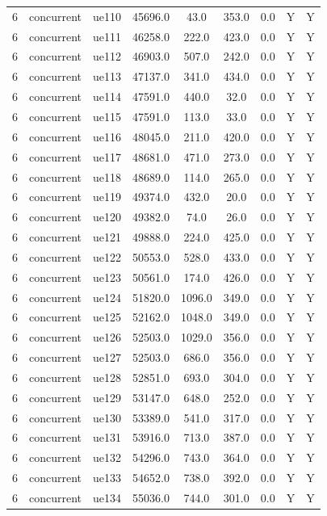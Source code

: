 \begin{table}[ht]
\begin{tabular}{|c|c|c|c|c|c|c|c|c|}
6 & concurrent & ue110 & 45696.0 & 43.0 & 353.0 & 0.0 & Y & Y \\
6 & concurrent & ue111 & 46258.0 & 222.0 & 423.0 & 0.0 & Y & Y \\
6 & concurrent & ue112 & 46903.0 & 507.0 & 242.0 & 0.0 & Y & Y \\
6 & concurrent & ue113 & 47137.0 & 341.0 & 434.0 & 0.0 & Y & Y \\
6 & concurrent & ue114 & 47591.0 & 440.0 & 32.0 & 0.0 & Y & Y \\
6 & concurrent & ue115 & 47591.0 & 113.0 & 33.0 & 0.0 & Y & Y \\
6 & concurrent & ue116 & 48045.0 & 211.0 & 420.0 & 0.0 & Y & Y \\
6 & concurrent & ue117 & 48681.0 & 471.0 & 273.0 & 0.0 & Y & Y \\
6 & concurrent & ue118 & 48689.0 & 114.0 & 265.0 & 0.0 & Y & Y \\
6 & concurrent & ue119 & 49374.0 & 432.0 & 20.0 & 0.0 & Y & Y \\
6 & concurrent & ue120 & 49382.0 & 74.0 & 26.0 & 0.0 & Y & Y \\
6 & concurrent & ue121 & 49888.0 & 224.0 & 425.0 & 0.0 & Y & Y \\
6 & concurrent & ue122 & 50553.0 & 528.0 & 433.0 & 0.0 & Y & Y \\
6 & concurrent & ue123 & 50561.0 & 174.0 & 426.0 & 0.0 & Y & Y \\
6 & concurrent & ue124 & 51820.0 & 1096.0 & 349.0 & 0.0 & Y & Y \\
6 & concurrent & ue125 & 52162.0 & 1048.0 & 349.0 & 0.0 & Y & Y \\
6 & concurrent & ue126 & 52503.0 & 1029.0 & 356.0 & 0.0 & Y & Y \\
6 & concurrent & ue127 & 52503.0 & 686.0 & 356.0 & 0.0 & Y & Y \\
6 & concurrent & ue128 & 52851.0 & 693.0 & 304.0 & 0.0 & Y & Y \\
6 & concurrent & ue129 & 53147.0 & 648.0 & 252.0 & 0.0 & Y & Y \\
6 & concurrent & ue130 & 53389.0 & 541.0 & 317.0 & 0.0 & Y & Y \\
6 & concurrent & ue131 & 53916.0 & 713.0 & 387.0 & 0.0 & Y & Y \\
6 & concurrent & ue132 & 54296.0 & 743.0 & 364.0 & 0.0 & Y & Y \\
6 & concurrent & ue133 & 54652.0 & 738.0 & 392.0 & 0.0 & Y & Y \\
6 & concurrent & ue134 & 55036.0 & 744.0 & 301.0 & 0.0 & Y & Y \\

\end{tabular}
\end{table}
